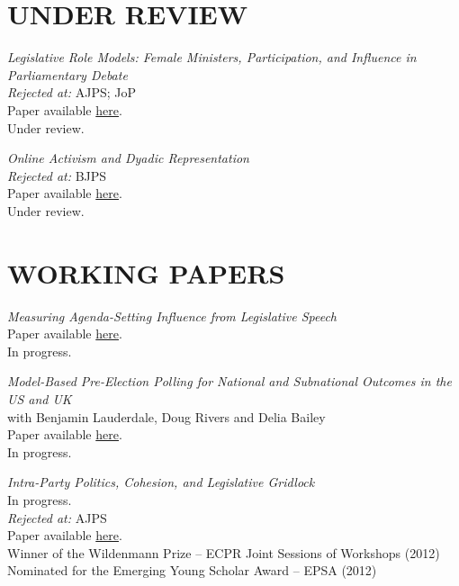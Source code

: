 \documentclass[centered]{res}
\begin{document}
\begin{resume}
\section{UNDER REVIEW} 
{\sl Legislative Role Models: Female Ministers, Participation, and Influence in Parliamentary Debate} \\
\emph{Rejected at:} AJPS; JoP\\
Paper available \href{https://www.jackblumenau.com/papers/gender.pdf} {here}.\\
Under review.

{\sl Online Activism and Dyadic Representation} \\
\emph{Rejected at:} BJPS\\
Paper available \href{https://www.jackblumenau.com/papers/petitions.pdf} {here}.\\
Under review.

\section{WORKING PAPERS} 
{\sl Measuring Agenda-Setting Influence from Legislative Speech} \\
Paper available \href{https://www.jackblumenau.com/papers/influence.pdf} {here}.\\
In progress.

{\sl Model-Based Pre-Election Polling for National and Subnational Outcomes in the US and UK} \\
with Benjamin Lauderdale, Doug Rivers and Delia Bailey\\ 
Paper available \href{https://www.jackblumenau.com/papers/mrp_polling.pdf} {here}.\\
In progress.


{\sl Intra-Party Politics, Cohesion, and Legislative Gridlock}  \\
In progress.\\
\emph{Rejected at:} AJPS\\
Paper available \href{https://http://www.jackblumenau.com/papers/ep_blocking.pdf} {here}.\\
Winner of the Wildenmann Prize -- ECPR Joint Sessions of Workshops  (2012)\\
Nominated for the Emerging Young Scholar Award -- EPSA (2012)\\


\end{resume}
\end{document}
